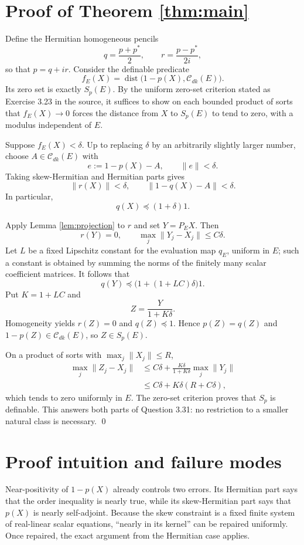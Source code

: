\documentclass[11pt]{article}
\newcommand{\dist}{\operatorname{dist}}
\newcommand{\C}{\mathcal C}
\begin{document}
\section{Proof of Theorem \ref{thm:main}}

Define the Hermitian homogeneous pencils
\[
 q=\frac{p+p^*}{2},
 \qquad
 r=\frac{p-p^*}{2i},
\]
so that $p=q+ir$. Consider the definable predicate
\[
 f_E(X)=\dist\bigl(1-p(X),\C_{dk}(E)\bigr).
\]
Its zero set is exactly $S_p(E)$. By the uniform zero-set criterion stated as
Exercise 3.23 in the source, it suffices to show on each bounded product of
sorts that $f_E(X)\to0$ forces the distance from $X$ to $S_p(E)$ to tend to
zero, with a modulus independent of $E$.

Suppose $f_E(X)<\delta$. Up to replacing $\delta$ by an arbitrarily slightly
larger number, choose $A\in\C_{dk}(E)$ with
\[
 e:=1-p(X)-A,
 \qquad \|e\|<\delta.
\]
Taking skew-Hermitian and Hermitian parts gives
\[
 \|r(X)\|<\delta,
 \qquad
 \|1-q(X)-A\|<\delta.
\]
In particular,
\[
 q(X)\preceq(1+\delta)1.
\]

Apply Lemma \ref{lem:projection} to $r$ and set $Y=P_EX$. Then
\[
 r(Y)=0,
 \qquad
 \max_j\|Y_j-X_j\|\le C\delta.
\]
Let $L$ be a fixed Lipschitz constant for the evaluation map $q_E$, uniform
in $E$; such a constant is obtained by summing the norms of the finitely many
scalar coefficient matrices. It follows that
\[
 q(Y)\preceq \bigl(1+(1+LC)\delta\bigr)1.
\]
Put $K=1+LC$ and
\[
 Z=\frac{Y}{1+K\delta}.
\]
Homogeneity yields $r(Z)=0$ and $q(Z)\preceq1$. Hence
$p(Z)=q(Z)$ and $1-p(Z)\in\C_{dk}(E)$, so $Z\in S_p(E)$.

On a product of sorts with $\max_j\|X_j\|\le R$,
\begin{align*}
 \max_j\|Z_j-X_j\|
 &\le C\delta+
 \frac{K\delta}{1+K\delta}\max_j\|Y_j\|\\
 &\le C\delta+K\delta(R+C\delta),
\end{align*}
which tends to zero uniformly in $E$. The zero-set criterion proves that
$S_p$ is definable. This answers both parts of Question 3.31: no restriction
to a smaller natural class is necessary. \qed

\section{Proof intuition and failure modes}

Near-positivity of $1-p(X)$ already controls two errors. Its Hermitian part
says that the order inequality is nearly true, while its skew-Hermitian part
says that $p(X)$ is nearly self-adjoint. Because the skew constraint is a
fixed finite system of real-linear scalar equations, ``nearly in its kernel''
can be repaired uniformly. Once repaired, the exact argument from the
Hermitian case applies.
\end{document}

